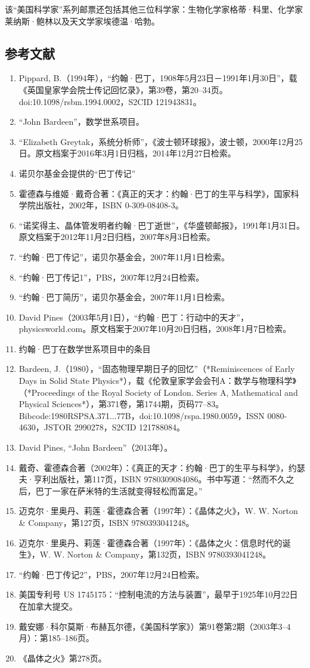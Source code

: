 该“美国科学家”系列邮票还包括其他三位科学家：生物化学家格蒂·科里、化学家莱纳斯·鲍林以及天文学家埃德温·哈勃。
\subsection{参考文献}
\begin{enumerate}
\item Pippard, B.（1994年），“约翰·巴丁，1908年5月23日－1991年1月30日”，载《英国皇家学会院士传记回忆录》，第39卷，第20–34页。doi:10.1098/rsbm.1994.0002，S2CID 121943831。
\item “John Bardeen”，数学世系项目。
\item “Elizabeth Greytak，系统分析师”，《波士顿环球报》，波士顿，2000年12月25日。原文档案于2016年3月1日归档，2014年12月27日检索。
\item 诺贝尔基金会提供的“巴丁传记”
\item 霍德森与维姬·戴奇合著：《真正的天才：约翰·巴丁的生平与科学》，国家科学院出版社，2002年，ISBN 0-309-08408-3。
\item “诺奖得主、晶体管发明者约翰·巴丁逝世”，《华盛顿邮报》，1991年1月31日。原文档案于2012年11月2日归档，2007年8月3日检索。
\item “约翰·巴丁传记”，诺贝尔基金会，2007年11月1日检索。
\item “约翰·巴丁传记1”，PBS，2007年12月24日检索。
\item “约翰·巴丁简历”，诺贝尔基金会，2007年11月1日检索。
\item David Pines（2003年5月1日），“约翰·巴丁：行动中的天才”，physicsworld.com。原文档案于2007年10月20日归档，2008年1月7日检索。

\item 约翰·巴丁在数学世系项目中的条目

\item Bardeen, J.（1980），“固态物理早期日子的回忆”（*Reminiscences of Early Days in Solid State Physics*），载《伦敦皇家学会会刊A：数学与物理科学》（*Proceedings of the Royal Society of London. Series A, Mathematical and Physical Sciences*），第371卷，第1744期，页码77–83。Bibcode:1980RSPSA.371...77B，doi:10.1098/rspa.1980.0059，ISSN 0080-4630，JSTOR 2990278，S2CID 121788084。
\item David Pines, “John Bardeen”（2013年）。
\item 戴奇、霍德森合著（2002年）：《真正的天才：约翰·巴丁的生平与科学》，约瑟夫·亨利出版社，第117页，ISBN 9780309084086。书中写道：“然而不久之后，巴丁一家在萨米特的生活就变得轻松而富足。”
\item 迈克尔·里奥丹、莉莲·霍德森合著（1997年）：《晶体之火》，W. W. Norton & Company，第127页，ISBN 9780393041248。
\item 迈克尔·里奥丹、莉莲·霍德森合著（1997年）：《晶体之火：信息时代的诞生》，W. W. Norton & Company，第132页，ISBN 9780393041248。
\item “约翰·巴丁传记2”，PBS，2007年12月24日检索。
\item 美国专利号 US 1745175：“控制电流的方法与装置”，最早于1925年10月22日在加拿大提交。
\item 戴安娜·科尔莫斯·布赫瓦尔德，《美国科学家》）第91卷第2期（2003年3–4月）：第185–186页。
\item 《晶体之火》第278页。


\end{enumerate}
